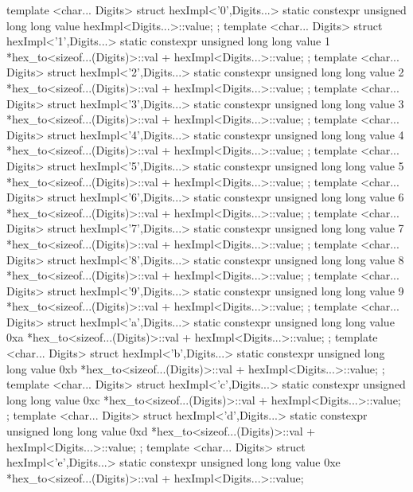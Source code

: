 \documentclass[ebook,11pt,article]{memoir}
\begin{document}
\begin{codeblock}
{{{{template <char... Digits>
struct hexImpl<'0',Digits...>{
	static constexpr unsigned long long value{ hexImpl<Digits...>::value};
};
template <char... Digits>
struct hexImpl<'1',Digits...>{
	static constexpr unsigned long long value{ 1 *hex_to<sizeof...(Digits)>::val
						    + hexImpl<Digits...>::value};
};
template <char... Digits>
struct hexImpl<'2',Digits...>{
	static constexpr unsigned long long value{ 2 *hex_to<sizeof...(Digits)>::val
						    + hexImpl<Digits...>::value};
};
template <char... Digits>
struct hexImpl<'3',Digits...>{
	static constexpr unsigned long long value{ 3 *hex_to<sizeof...(Digits)>::val
						    + hexImpl<Digits...>::value};
};
template <char... Digits>
struct hexImpl<'4',Digits...>{
	static constexpr unsigned long long value{ 4 *hex_to<sizeof...(Digits)>::val
						    + hexImpl<Digits...>::value};
};
template <char... Digits>
struct hexImpl<'5',Digits...>{
	static constexpr unsigned long long value{ 5 *hex_to<sizeof...(Digits)>::val
						    + hexImpl<Digits...>::value};
};
template <char... Digits>
struct hexImpl<'6',Digits...>{
	static constexpr unsigned long long value{ 6 *hex_to<sizeof...(Digits)>::val
						    + hexImpl<Digits...>::value};
};
template <char... Digits>
struct hexImpl<'7',Digits...>{
	static constexpr unsigned long long value{ 7 *hex_to<sizeof...(Digits)>::val
						    + hexImpl<Digits...>::value};
};
template <char... Digits>
struct hexImpl<'8',Digits...>{
	static constexpr unsigned long long value{ 8 *hex_to<sizeof...(Digits)>::val
						    + hexImpl<Digits...>::value};
};
template <char... Digits>
struct hexImpl<'9',Digits...>{
	static constexpr unsigned long long value{ 9 *hex_to<sizeof...(Digits)>::val
						   + hexImpl<Digits...>::value};
};
template <char... Digits>
struct hexImpl<'a',Digits...>{
	static constexpr unsigned long long value{ 0xa *hex_to<sizeof...(Digits)>::val  
						   + hexImpl<Digits...>::value};
};
template <char... Digits>
struct hexImpl<'b',Digits...>{
	static constexpr unsigned long long value{ 0xb *hex_to<sizeof...(Digits)>::val
						   + hexImpl<Digits...>::value};
};
template <char... Digits>
struct hexImpl<'c',Digits...>{
	static constexpr unsigned long long value{ 0xc *hex_to<sizeof...(Digits)>::val
						   + hexImpl<Digits...>::value};
};
template <char... Digits>
struct hexImpl<'d',Digits...>{
	static constexpr unsigned long long value{ 0xd *hex_to<sizeof...(Digits)>::val
						   + hexImpl<Digits...>::value};
};
template <char... Digits>
struct hexImpl<'e',Digits...>{
	static constexpr unsigned long long value{ 0xe *hex_to<sizeof...(Digits)>::val
						   + hexImpl<Digits...>::value};
}}}}}
\end{codeblock}
\end{document}
